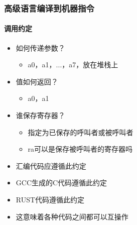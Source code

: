 \begin{frame}
	\frametitle{高级语言编译到机器指令}
\framesubtitle{调用约定}
	
 \begin{itemize}
	\item 如何传递参数？
	\begin{itemize}
	 	\item a0，a1，...，a7，放在堆栈上
	\end{itemize}
	\item 值如何返回？
	\begin{itemize}
		\item a0，a1
	\end{itemize}	
	\item 谁保存寄存器？
	\begin{itemize}
		\item 指定为已保存的呼叫者或被呼叫者
	    \item ra可以是保存被呼叫者的寄存器吗
    \end{itemize}   
	
	\item 汇编代码应遵循此约定
	\item GCC生成的C代码遵循此约定
	\item RUST代码遵循此约定
	\item 这意味着各种代码之间都可以互操作

\end{itemize} 
	
\end{frame}


